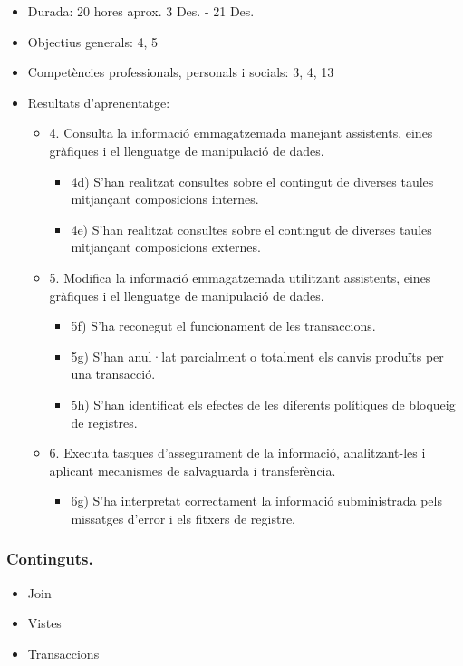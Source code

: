 \documentclass[catalan, a4paper, 12pt, titlepage]{article}
\begin{document}
  \begin{itemize}
	\item Durada: 20 hores aprox. 3 Des. - 21 Des.
	\item Objectius generals: 4, 5
	\item Competències professionals, personals i socials: 3, 4, 13
	\item Resultats d'aprenentatge: 
		\begin{itemize}
			\item 4. Consulta la informació emmagatzemada manejant assistents, eines gràfiques i el llenguatge de manipulació de dades.
				\begin{itemize}
					\item 4d) S'han realitzat consultes sobre el contingut de diverses taules mitjançant composicions internes.
					\item 4e) S'han realitzat consultes sobre el contingut de diverses taules mitjançant composicions externes.
				\end{itemize}
			\item 5. Modifica la informació emmagatzemada utilitzant assistents, eines gràfiques i el llenguatge de manipulació de dades.
				\begin{itemize}
					\item 5f) S'ha reconegut el funcionament de les transaccions.
					\item 5g) S'han anul·lat parcialment o totalment els canvis produïts per una transacció.
					\item 5h) S'han identificat els efectes de les diferents polítiques de bloqueig de registres.
				\end{itemize}
			\item 6. Executa tasques d'assegurament de la informació, analitzant-les i aplicant mecanismes de salvaguarda i transferència.
				\begin{itemize}
					\item 6g) S'ha interpretat correctament la informació subministrada pels missatges d'error i els fitxers de registre.
				\end{itemize}
		\end{itemize}
  \end{itemize}

  \subsubsection{Continguts.}

  \begin{itemize}
	  \item Join
	  \item Vistes
	  \item Transaccions
  \end{itemize}
\end{document}
